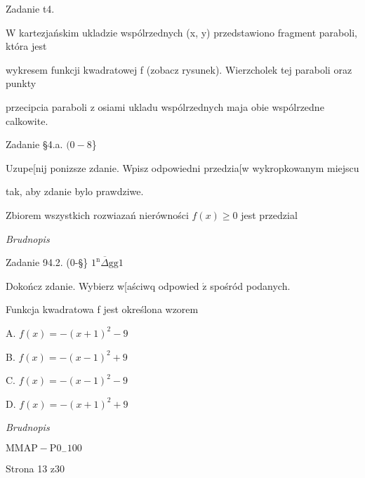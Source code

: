\documentclass[a4paper,12pt]{article}
\begin{document}
Zadanie t4.

W kartezjańskim ukladzie wspólrzednych (x, y) przedstawiono fragment paraboli, która jest

wykresem funkcji kwadratowej f (zobacz rysunek). Wierzcholek tej paraboli oraz punkty

przecipcia paraboli z osiami ukladu wspólrzednych maja obie wspólrzedne calkowite.

Zadanie \S 4.a. $(0-8$\}

Uzupe[nij ponizsze zdanie. Wpisz odpowiedni przedzia[w wykropkowanym miejscu

tak, aby zdanie bylo prawdziwe.

Zbiorem wszystkich rozwiazań nierówności $f(x)\geq 0$ jest przedzial

{\it Brudnopis}

Zadanie 94.2. (0-\S\} $\overline{1^{\mathrm{n}}\Delta \mathrm{g}\mathrm{g}}1$

Dokończ zdanie. Wybierz w[aściwq odpowied $\acute{\mathrm{z}}$ spośród podanych.

Funkcja kwadratowa f jest określona wzorem

A. $f(x)=-(x+1)^{2}-9$

B. $f(x)=-(x-1)^{2}+9$

C. $f(x)=-(x-1)^{2}-9$

D. $f(x)=-(x+1)^{2}+9$

{\it Brudnopis}

$\mathrm{M}\mathrm{M}\mathrm{A}\mathrm{P}-\mathrm{P}0_{-}100$

Strona 13 z30
\end{document}
